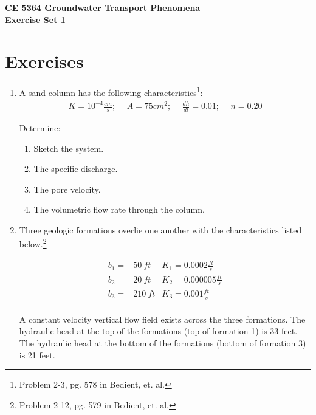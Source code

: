 \documentclass[12pt]{article}
\begin{document}
\begin{center}
{\textbf{{ CE 5364 Groundwater Transport Phenomena } \\ {Exercise Set 1}}}
\end{center}

\section*{\small{Exercises}}
\begin{enumerate}
\item 

A sand column has the following characteristics\footnote{Problem 2-3, pg. 578 in Bedient, et. al.}:
\begin{equation}
  \begin{aligned}
    K = 10^{-4} \frac{cm}{s}; & ~~A = 75 cm^{2}; & ~~\frac{dh}{dl} = 0.01; & ~~n = 0.20 
  \end{aligned}
\end{equation}

Determine:
\begin{enumerate}
\item Sketch the system.
\item The specific discharge.
\item The pore velocity.
\item The volumetric flow rate through the column.
\end{enumerate}
\clearpage

\item Three geologic formations overlie one another with the characteristics listed below.\footnote{Problem 2-12, pg. 579 in Bedient, et. al.}

\begin{equation}
  \begin{aligned}
b_1 = & 50~ft &K_1 =   0.0002 \frac{ft}{s} \\ 
b_2 = & 20~ft &K_2 = 0.000005 \frac{ft}{s} \\
b_3 = &210~ft &K_3 =    0.001 \frac{ft}{s} \\
  \end{aligned}
\end{equation}

A constant velocity vertical flow field exists across the three formations.
The hydraulic head at the top of the formations (top of formation 1) is 33 feet.  The hydraulic head at the bottom of the formations (bottom of formation 3) is 21 feet.


\end{enumerate}
\end{document}
